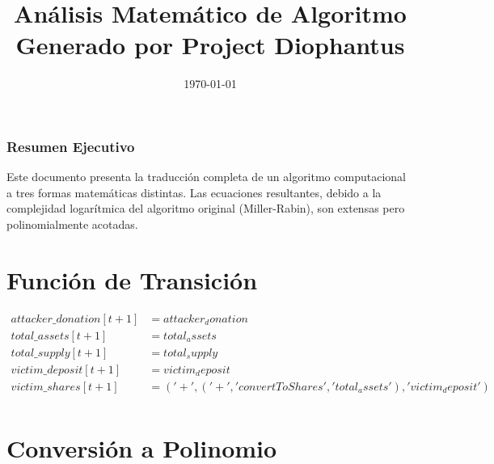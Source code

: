 \documentclass[10pt, a4paper]{article}
\title{Análisis Matemático de Algoritmo \\ \large Generado por Project Diophantus}
\author{}
\date{\today}
\begin{document}
\maketitle
\section*{Resumen Ejecutivo}
Este documento presenta la traducción completa de un algoritmo computacional a tres formas matemáticas distintas.
Las ecuaciones resultantes, debido a la complejidad logarítmica del algoritmo original (Miller-Rabin), son extensas pero polinomialmente acotadas.
\part{Función de Transición}
\begin{align*}
attacker\_donation[t+1] &= attacker_donation \\
total\_assets[t+1] &= total_assets \\
total\_supply[t+1] &= total_supply \\
victim\_deposit[t+1] &= victim_deposit \\
victim\_shares[t+1] &= ('+', ('+', 'convertToShares', 'total_assets'), 'victim_deposit') \\
\end{align*}\part{Conversión a Polinomio}
\end{document}
